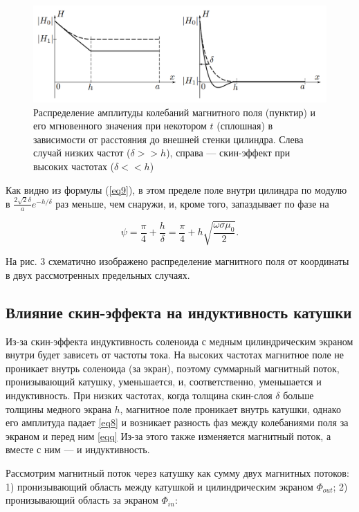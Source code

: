 \documentclass[a4paper,12pt]{article}
\theoremstyle{plain} %
\theoremstyle{definition} %
\theoremstyle{remark} %
\begin{document}
	\begin{figure}[h]
		\centering
		\includegraphics[width=0.9\linewidth]{fields.png}
		\caption{Распределение амплитуды колебаний магнитного поля (пунктир) и его мгновенного значения при некотором $t$ (сплошная) в зависимости от расстояния до внешней стенки цилиндра. Слева случай низких частот ($\delta >> h$), справа — скин-эффект при высоких частотах ($\delta << h$)}
		\label{fig:mpr}
	\end{figure}
	
	Как видно из формулы (\ref{eq9}), в этом пределе поле внутри цилиндра по модулю в $\frac{2\sqrt{2} \delta}{a} e^{-h/\delta}$ раз меньше, чем снаружи, и, кроме того, запаздывает по фазе на 
	
	\begin{equation}\label{eq10}
		\psi = \frac{\pi}{4} + \frac{h}{\delta} = \frac{\pi}{4} + h\sqrt{\frac{\omega \sigma \mu_0}{2}}.
	\end{equation}
	
	\indent На рис. 3 схематично изображено распределение магнитного поля от координаты в двух рассмотренных предельных случаях.\\

\subsection{Влияние скин-эффекта на индуктивность катушки}

Из-за скин-эффекта индуктивность соленоида с медным цилиндрическим экраном внутри будет зависеть от частоты тока. На высоких частотах магнитное поле не проникает внутрь соленоида (за экран), поэтому суммарный магнитный поток, пронизывающий катушку, уменьшается, и, соответственно, уменьшается и индуктивность. При низких частотах, когда толщина скин-слоя $\delta$ больше толщины медного экрана $h$, магнитное поле проникает внутрь катушки, однако его амплитуда падает \eqref{eq8} и возникает разность фаз между колебаниями поля за экраном и перед ним \eqref{eqq} Из-за этого также изменяется магнитный поток, а вместе с ним --- и индуктивность. 

Рассмотрим магнитный поток через катушку как сумму двух магнитных потоков: 1) пронизывающий область между катушкой и цилиндрическим экраном $\Phi_{out}$; 2) пронизывающий область за экраном $\Phi_{in}$:
\end{document}
